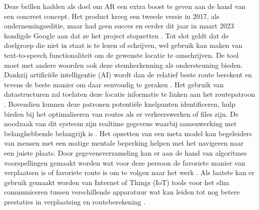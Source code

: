   Deze brillen hadden als doel om AR een extra boost te geven aan de hand van een concreet concept.
  Het product kreeg een tweede versie in 2017, als ondernemingseditie, maar had geen succes en eerder dit jaar in maart 2023 kondigde Google aan dat ze het project stopzetten \autocite{Gvora2023}.
  Tot slot geldt dat de doelgroep die niet in staat is te lezen of schrijven, wel gebruik kan maken van text-to-speech functionaliteit om de gewenste locatie te omschrijven.
  De tool moet met andere woorden ook deze stemherkenning als ondersteuning bieden.
  Dankzij artificiële intelligentie (AI) wordt dan de relatief beste route berekent en tevens de beste manier om daar eenvoudig te geraken \autocite{Soni2023a}.
  Het gebruik van datastructuren zal toelaten deze locatie informatie te linken aan het routepatroon \autocite{Ruta2010}.
  Bovendien kunnen deze patronen potentiële knelpunten identificeren, hulp bieden bij het optimaliseren van routes als er verkeerswerken of files zijn.
  De noodzaak van dit systeem zijn realtime gegevens waarbij samenwerking met belanghebbende belangrijk is \autocite{Ciravegna2018}.
  Het opzetten van een meta model kan begeleiders van mensen met een matige mentale beperking helpen met het navigeren naar een juiste plaats.
  Door gegevensverzameling kan er aan de hand van algoritmes voorspellingen gemaakt worden wat voor deze persoon de favoriete manier van verplaatsen is of favoriete route is om te volgen naar het werk \autocite{Stepanov2003}.
  Als laatste kan er gebruik gemaakt worden van Internet of Things (IoT) tools voor het slim communiceren tussen verschillende apparatuur wat kan leiden tot nog betere prestaties in verplaatsing en routeberekening \autocite{Fatnassi2015}.
